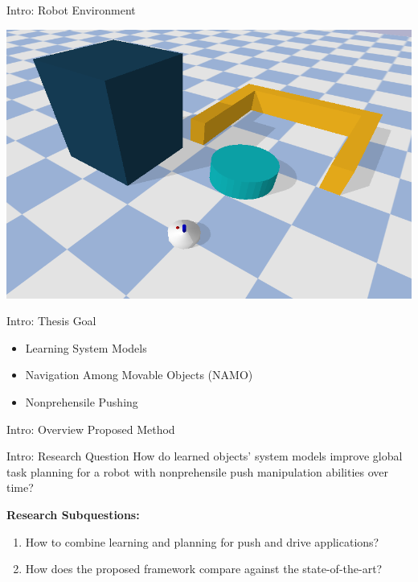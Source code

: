\begin{frame}[fragile]{Intro: Robot Environment} %
\begin{center}
\includegraphics[width=1.0\textwidth]{figures/introduction/blockade}
\end{center}
\end{frame}

\begin{frame}[fragile]{Intro: Thesis Goal} %
\begin{itemize}
  \item Learning System Models\\%
  \item Navigation Among Movable Objects (NAMO)\\
  \item Nonprehensile Pushing
\end{itemize}
\end{frame}

\begin{frame}[c]{Intro: Overview Proposed Method} %
  
\end{frame}

\begin{frame}[fragile]{Intro: Research Question}
\large
How do learned objects' system models improve global task planning for a robot with nonprehensile push manipulation abilities over time? \bs

\textbf{Research Subquestions:}
\begin{enumerate}
    \item\label{researchsubquestion:does_it_work}\small How to combine learning and planning for push and drive applications?
    \item\label{researchsubquestion:does_it_compare}\small How does the proposed framework compare against the state-of-the-art?
\end{enumerate}
\end{frame}

